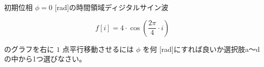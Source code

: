 初期位相 $\phi = 0$ [rad]の時間領域ディジタルサイン波 

\[
f[i] = 4 \cdot \cos \left ( \frac{2 \pi}{4}  \cdot i \right )
\]

\noindent のグラフを右に $1$ 点平行移動させるには $\phi$ を何 [rad]にすれば良いか選択肢a〜dの中から1つ選びなさい。
